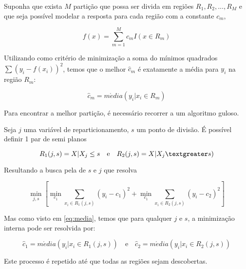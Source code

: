 Suponha que exista \begin{math}M\end{math} partição que possa ser divida em regiões \begin{math}R_{1}, R_{2}, ..., R_{M} \end{math} e que seja possível modelar a resposta para cada região com a constante \begin{math}c_{m}\end{math}, 

\begin{equation}
f(x) = \sum_{m=1}^{M}c_{m}I( x \in R_{m} )
\end{equation}

Utilizando como critério de minimização a soma do mínimos quadrados \begin{math}\sum{ (y_{i} - f(x_{i}))^{2}}\end{math}, temos que o melhor \begin{math}\hat c_{m}\end{math} é exatamente a média para \begin{math}y_{i}\end{math} na região \begin{math}R_{m}\end{math}:

\begin{equation}
\label{eq:media}
\hat c_{m} = m\acute edia(y_{i} | x_{i} \in R_{m})
\end{equation}

Para encontrar a melhor partição, é necessário recorrer a um algoritmo guloso.

Seja \begin{math}j\end{math} uma variável de reparticionamento, $s$ um ponto de divisão. É possível definir 1 par de semi planos 

\begin{equation}
R_{1}(j,s) = {X | X_{j}\leq s} \quad \textrm{e} \quad R_{2}(j,s) = {X | X_{j}\textgreater s})
\end{equation}

Resultando a busca pela de \begin{math}s\end{math} e \begin{math}j\end{math} que resolva

\begin{equation}
\min_{j,s} \left [ \min_{c_{1}} \sum_{x_{i} \in R_{1} (j,s)} (y_{i} - c_{1})^{2} + \min_{c_{1}} \sum_{x_{i} \in R_{2} (j,s)}(y_{i} - c_{2})^{2} \right ]
\end{equation} 


Mas como visto em \ref{eq:media}, temos que para qualquer $j$ e $s$, a minimização interna pode ser resolvida por:

\begin{equation}
\hat c_{1} = m\acute edia(y_{i} | x_{i} \in R_{1}(j,s)) \quad \textrm{e} \quad \hat c_{2} = m\acute edia(y_{i} | x_{i} \in R_{2}(j,s))
\end{equation} 

Este processo é repetido até que todas as regiões sejam descobertas.
